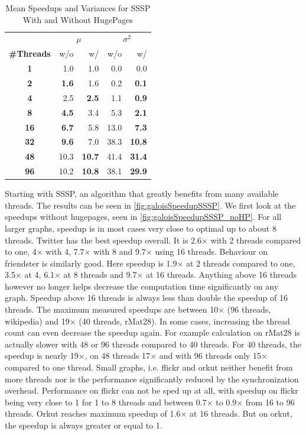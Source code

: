 \begin{table}
\renewcommand{\arraystretch}{1.3}
\centering
\caption{Mean Speedups and Variances for SSSP With and Without HugePages}
\label{tbl:ssspMeansVariances}
\begin{tabular}{c
r@{\tabskip 1 \tabcolsep}r
r@{\tabskip 1 \tabcolsep}r}
\toprule
&\multicolumn{2}{c}{\!\!\!$\mu$}&\multicolumn{2}{c}{\!\!$\sigma^2$}\\
\cmidrule(r){2-3}\cmidrule(r){4-5}
{\bf\#Threads}&w/o&w/&w/o&w/\\\midrule
\bf1 & 1.0 & 1.0 & 0.0 & 0.0 \\
\bf2 & \bf 1.6 & 1.6 & 0.2 & \bf 0.1 \\
\bf4 & 2.5 & \bf 2.5 & 1.1 & \bf 0.9 \\
\bf8 & \bf 4.5 & 3.4 & 5.3 & \bf 2.1 \\
\bf16 & \bf 6.7 & 5.8 & 13.0 & \bf 7.3 \\
\bf32 & \bf 9.6 & 7.0 & 38.3 & \bf 10.8 \\
\bf48 & 10.3 & \bf 10.7 & 41.4 & \bf 31.4 \\
\bf96 & 10.2 & \bf 10.8 & 38.1 & \bf 29.9 \\
\bottomrule
\end{tabular}
\end{table}

Starting with SSSP, an algorithm that greatly benefits from many available threads. The results can be seen in \autoref{fig:galoisSpeedupSSSP}.
We first look at the speedups without hugepages, seen in \autoref{fig:galoisSpeedupSSSP_noHP}.
For all larger graphs, speedup is in most cases very close to optimal up to about 8 threads.
Twitter has the best speedup overall. It is 2.6$\times$ with 2 threads compared to one, 4$\times$ with 4, 7.7$\times$ with 8 and 9.7$\times$ using 16 threads.
Behaviour on friendster is similarly good. Here speedup is 1.9$\times$ at 2 threads compared to one, 3.5$\times$ at 4, 6.1$\times$ at 8 threads and 9.7$\times$ at 16 threads.
Anything above 16 threads however no longer helps decrease the computation time significantly on any graph. Speedup above 16 threads is always less than double the speedup of 16 threads. The maximum measured speedups are between 10$\times$ (96 threads, wikipedia) and 19$\times$ (40 threads, rMat28).
In some cases, increasing the thread count can even decrease the speedup again. For example calculation on rMat28 is actually slower with 48 or 96 threads compared to 40 threads. For 40 threads, the speedup is nearly 19$\times$, on 48 threads 17$\times$ and with 96 threads only 15$\times$ compared to one thread.
Small graphs, i.e. flickr and orkut neither benefit from more threads nor is the performance significantly reduced by the synchronization overhead.
Performance on flickr can not be sped up at all, with speedup on flickr being very close to 1 for 1 to 8 threads and between 0.7$\times$ to 0.9$\times$ from 16 to 96 threads.
Orkut reaches maximum speedup of 1.6$\times$ at 16 threads. But on orkut, the speedup is always greater or equal to 1.

